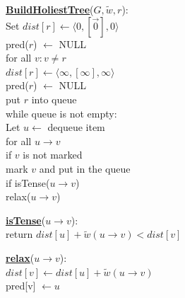 \documentclass{article}
\begin{document}
\begin{minipage}[t]{0.48\linewidth}
\begin{algorithm}
\textbf{\underline{BuildHoliestTree}}($G, \tilde w , r$): \\ \quad
Set $dist[r] \leftarrow \langle 0, [\vec{0}], 0 \rangle$ \\ \quad \quad
    pred($r$) $\leftarrow$ NULL \\ \quad
for all $v : v \neq r$ \\ \quad \quad
    $dist[r] \leftarrow \langle \infty, [\infty], \infty \rangle$ \\ \quad \quad
    pred($r$) $\leftarrow$ NULL \\ \quad
put $r$ into queue \\ \quad
while queue is not empty: \\ \quad \quad
    Let $u \leftarrow$ dequeue item \\ \quad \quad
    for all $u \rightarrow v$ \\ \qquad \quad
        if $v$ is not marked \\ \quad \qquad \quad
           mark $v$ and put in the queue \\ \qquad \quad
        if isTense($u \rightarrow v$) \\ \quad \qquad \quad
           relax($u \rightarrow v$)
\end{algorithm}
\end{minipage}
\hfill%
\hspace{-4cm}
\begin{minipage}[t]{0.48\linewidth}
\begin{algorithm}
\textbf{\underline{isTense}}($u \rightarrow v$): \\ \quad
return $dist[u] + \tilde w(u \rightarrow v) < dist[v]$ \\

\end{algorithm}

\vspace{0.5cm}

\begin{algorithm}
\textbf{\underline{relax}}($u \rightarrow v$): \\ \quad
$dist[v] \leftarrow dist[u] + \tilde w(u \rightarrow v)$ \\ \quad
pred[v] $\leftarrow u$ \\
\end{algorithm}
\end{minipage}

\vspace{0.5cm}
\end{document}
